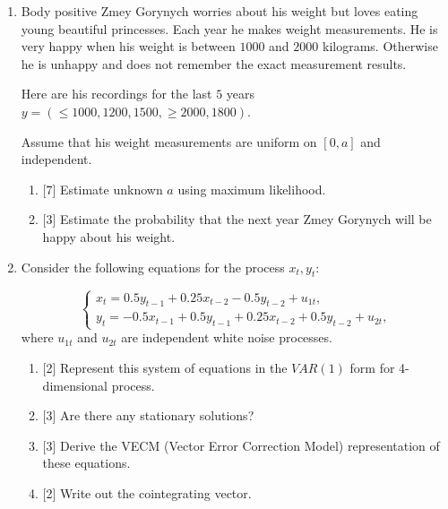 \documentclass[12pt]{article}
\begin{document}
\begin{enumerate}
    \item Body positive Zmey Gorynych worries about his weight but loves eating young beautiful princesses.
    Each year he makes weight measurements.
    He is very happy when his weight is between $1000$ and $2000$ kilograms.
    Otherwise he is unhappy and does not remember the exact measurement results. 

    Here are his recordings for the last $5$ years $y = (\leq 1000, 1200, 1500, \geq 2000, 1800)$.

    Assume that his weight measurements are uniform on $[0, a]$ and independent.

    \begin{enumerate}
        \item {[7]} Estimate unknown $a$ using maximum likelihood. 
        \item {[3]} Estimate the probability that the next year Zmey Gorynych will be happy about his weight.
    \end{enumerate}
     

\item Consider the following equations for the process \( x_t, y_t \):

\[
\begin{cases}
x_t = 0.5 y_{t-1} + 0.25 x_{t-2} - 0.5 y_{t-2} + u_{1t}, \\
y_t = -0.5 x_{t-1} + 0.5 y_{t-1} + 0.25 x_{t-2} + 0.5 y_{t-2} + u_{2t},
\end{cases}
\]
where \( u_{1t} \) and \( u_{2t} \) are independent white noise processes.

\begin{enumerate}
    \item {[2]} Represent this system of equations in the $VAR(1)$ form for 4-dimensional process. 
    \item {[3]} Are there any stationary solutions?
    \item {[3]} Derive the VECM (Vector Error Correction Model) representation of these equations. 
    \item {[2]} Write out the cointegrating vector.
\end{enumerate}



\end{enumerate}
\end{document}
